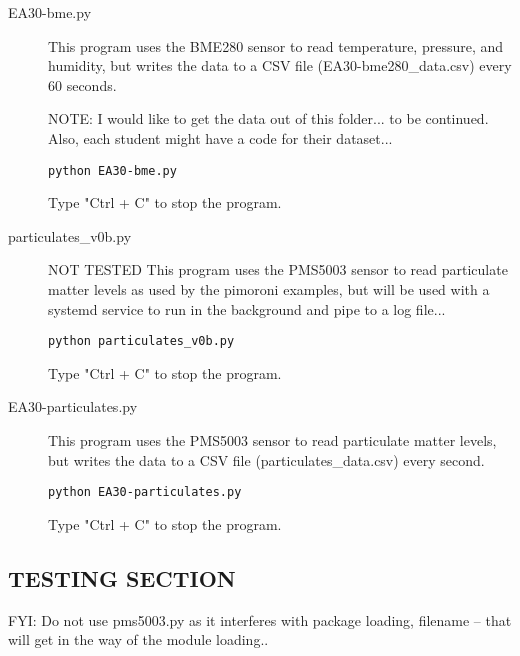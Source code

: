 \documentclass{article}
\begin{document}
\begin{description}

  \item[EA30-bme.py] This program uses the BME280 sensor to read temperature, pressure, and humidity, but writes the data to a CSV file (EA30-bme280\_data.csv) every 60 seconds. 
  
NOTE: I would like to get the data out of this folder... to be continued. Also, each student might have a code for their dataset...
  
\begin{verbatim}
python EA30-bme.py
\end{verbatim} 

Type "Ctrl + C" to stop the program.

\item[particulates\_v0b.py] NOT TESTED This program uses the PMS5003 sensor to read particulate matter levels as used by the pimoroni examples, but will be used with a systemd service to run in the background and pipe to a log file...


\begin{verbatim}
python particulates_v0b.py
\end{verbatim}



Type "Ctrl + C" to stop the program.

  
\item[EA30-particulates.py] This program uses the PMS5003 sensor to read particulate matter levels, but writes the data to a CSV file (particulates\_data.csv) every second.

\begin{verbatim}
python EA30-particulates.py
\end{verbatim}



Type "Ctrl + C" to stop the program.

\end{description}


\subsection{TESTING SECTION}

FYI: Do not use pms5003.py as it interferes with package loading, filename -- that will get in the way of the module loading..
\end{document}
